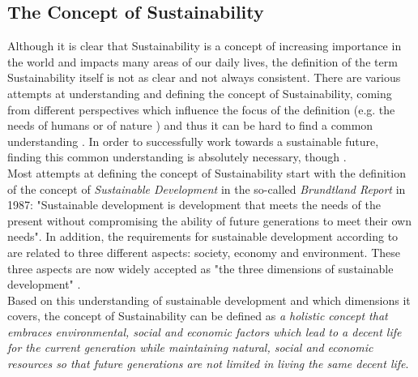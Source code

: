 \documentclass[oribibl]{llncs}
\begin{document}
\subsection{The Concept of Sustainability}
Although it is clear that Sustainability is a concept of increasing importance in the world and impacts many areas of our daily lives, the definition of the term Sustainability itself is not as clear and not always consistent. There are various attempts at understanding and defining the concept of Sustainability, coming from different perspectives which influence the focus of the definition (e.g. the needs of humans or of nature \cite{gladwin_shifting_1995}) and thus it can be hard to find a common understanding \cite{jamieson_sustainability_1998}%
. In order to successfully work towards a sustainable future, finding this common understanding is absolutely necessary, though \cite{jamieson_sustainability_1998}.\\
Most attempts at defining the concept of Sustainability start with the definition of the concept of \textit{Sustainable Development} in the so-called \textit{Brundtland Report} in 1987: "Sustainable development is development that meets the needs of the present without compromising the ability of future generations to meet their own needs"\cite[p.\,4]{Brundtland1987}. In addition, the requirements for sustainable development according to \cite{Brundtland1987} are related to three different aspects: society, economy and environment. These three aspects are now widely accepted as "the three dimensions of sustainable development" \cite[p.\,1]{UN_transform_15}.\\ %
Based on this understanding of sustainable development and which dimensions it covers, the concept of Sustainability can be defined as \textit{a holistic concept that embraces environmental, social and economic factors which lead to a decent life for the current generation while maintaining natural, social and economic resources so that future generations are not limited in living the same decent life}. %
\end{document}
